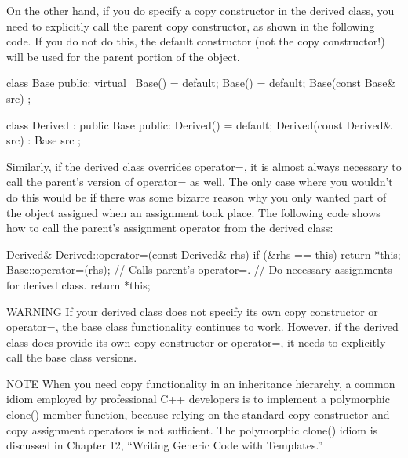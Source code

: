 On the other hand, if you do specify a copy constructor in the derived class, you need to explicitly call the parent copy constructor, as shown in the following code. If you do not do this, the default constructor (not the copy constructor!) will be used for the parent portion of the object.

\begin{cpp}
class Base
{
    public:
        virtual ~Base() = default;
        Base() = default;
        Base(const Base& src) { }
};

class Derived : public Base
{
    public:
        Derived() = default;
        Derived(const Derived& src) : Base { src } { }
};
\end{cpp}

Similarly, if the derived class overrides operator=, it is almost always necessary to call the parent’s version of operator= as well. The only case where you wouldn’t do this would be if there was some bizarre reason why you only wanted part of the object assigned when an assignment took place. The following code shows how to call the parent’s assignment operator from the derived class:

\begin{cpp}
Derived& Derived::operator=(const Derived& rhs)
{
    if (&rhs == this) { return *this; }
    Base::operator=(rhs); // Calls parent's operator=.
    // Do necessary assignments for derived class.
    return *this;
}
\end{cpp}

\begin{myWarning}{WARNING}
If your derived class does not specify its own copy constructor or operator=, the base class functionality continues to work. However, if the derived class does provide its own copy constructor or operator=, it needs to explicitly call the base class versions.
\end{myWarning}


\begin{myNotic}{NOTE}
When you need copy functionality in an inheritance hierarchy, a common idiom employed by professional C++ developers is to implement a polymorphic clone() member function, because relying on the standard copy constructor and copy assignment operators is not sufficient. The polymorphic clone() idiom is discussed in Chapter 12, “Writing Generic Code with Templates.”
\end{myNotic}


